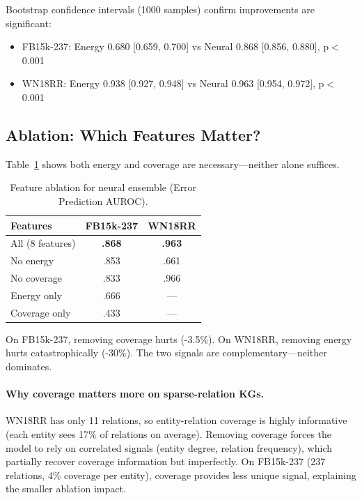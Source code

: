 \documentclass{article}
\begin{document}
Bootstrap confidence intervals (1000 samples) confirm improvements are significant:

\begin{itemize}
    \item FB15k-237: Energy 0.680 [0.659, 0.700] vs Neural 0.868 [0.856, 0.880], p$<$0.001
    \item WN18RR: Energy 0.938 [0.927, 0.948] vs Neural 0.963 [0.954, 0.972], p$<$0.001
\end{itemize}

\subsection{Ablation: Which Features Matter?}

Table~\ref{tab:ablation} shows both energy and coverage are necessary---neither alone suffices.

\begin{table}[h]
\centering
\caption{Feature ablation for neural ensemble (Error Prediction AUROC).}
\label{tab:ablation}
\begin{tabular}{lcc}
\toprule
Features & FB15k-237 & WN18RR \\
\midrule
All (8 features) & \textbf{.868} & \textbf{.963} \\
No energy & .853 & .661 \\
No coverage & .833 & .966 \\
Energy only & .666 & --- \\
Coverage only & .433 & --- \\
\bottomrule
\end{tabular}
\end{table}

On FB15k-237, removing coverage hurts (-3.5\%).
On WN18RR, removing energy hurts catastrophically (-30\%).
The two signals are complementary---neither dominates.

\paragraph{Why coverage matters more on sparse-relation KGs.}
WN18RR has only 11 relations, so entity-relation coverage is highly informative (each entity sees 17\% of relations on average).
Removing coverage forces the model to rely on correlated signals (entity degree, relation frequency), which partially recover coverage information but imperfectly.
On FB15k-237 (237 relations, 4\% coverage per entity), coverage provides less unique signal, explaining the smaller ablation impact.
\end{document}
